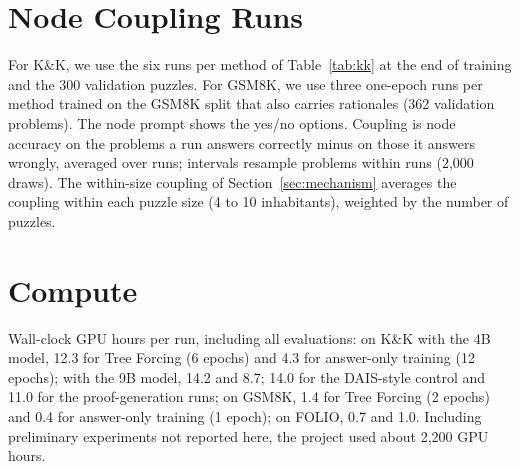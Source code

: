 \documentclass[10pt]{article}
\newcommand{\tf}{Tree Forcing}
\begin{document}
\section{Node Coupling Runs}
\label{app:coupling}
For K\&K, we use the six runs per method of Table~\ref{tab:kk} at the end of training and the 300 validation puzzles. For
GSM8K, we use three one-epoch runs per method trained on the GSM8K split that also carries rationales (362 validation
problems). The node prompt shows the yes/no options. Coupling is node accuracy on the
problems a run answers correctly minus on those it answers wrongly, averaged over runs; intervals resample problems
within runs (2,000 draws). The within-size coupling of Section~\ref{sec:mechanism} averages the coupling within each puzzle
size (4 to 10 inhabitants), weighted by the number of puzzles.

\section{Compute}
\label{app:compute}
Wall-clock GPU hours per run, including all evaluations: on K\&K with the 4B model, 12.3 for \tf{} (6 epochs) and 4.3
for answer-only training (12 epochs); with the 9B model, 14.2 and 8.7; 14.0 for the DAIS-style control and 11.0 for the
proof-generation runs; on GSM8K, 1.4 for \tf{} (2 epochs) and 0.4 for answer-only training (1 epoch); on FOLIO, 0.7
and 1.0. Including preliminary experiments not reported here, the project used about 2,200 GPU hours.
\end{document}
